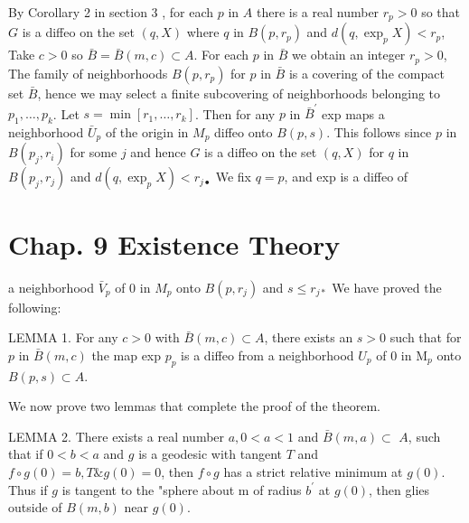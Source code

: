 \documentclass[10pt]{article}
\begin{document}
By Corollary 2 in section 3 , for each $p$ in $A$ there is a real number $r_{p}>0$ so that $G$ is a diffeo on the set $(q, X)$ where $q$ in $B\left(p, r_{p}\right)$ and $d\left(q, \exp _{p} X\right)<r_{p}$, Take $c>0$ so $\bar{B}=\bar{B}(m, c) \subset A .$ For each $p$ in $\bar{B}$ we obtain an integer $r_{p}>0$, The family of neighborhoods $B\left(p, r_{p}\right)$ for $p$ in $\bar{B}$ is a covering of the compact set $\bar{B}$, hence we may select a finite subcovering of neighborhoods belonging to $p_{1}, \ldots, p_{k}$. Let $s=\min \left[r_{1}, \ldots, r_{k}\right]$. Then for any $p$ in $\bar{B}^{\prime}$ exp maps a neighborhood $\bar{U}_{p}$ of the origin in $M_{p}$ diffeo onto $B(p, s)$. This follows since $p$ in $B\left(p_{j}, r_{i}\right)$ for some $j$ and hence $G$ is a diffeo on the set $(q, X)$ for $q$ in $B\left(p_{j}, r_{j}\right)$ and $d\left(q, \exp _{p} X\right)<r_{j \bullet}$ We fix $q=p$, and exp is a diffeo of

\section{Chap. 9 Existence Theory}
a neighborhood $\bar{V}_{p}$ of 0 in $M_{p}$ onto $B\left(p, r_{j}\right)$ and $s \leq r_{j *}$ We have proved the following:

LEMMA 1. For any $c>0$ with $\bar{B}(m, c) \subset A$, there exists an $s>0$ such that for $p$ in $\bar{B}(m, c)$ the map exp $p_{p}$ is a diffeo from a neighborhood $U_{p}$ of 0 in $\mathrm{M}_{p}$ onto $B(p, s) \subset A$.

We now prove two lemmas that complete the proof of the theorem.

LEMMA 2. There exists a real number $a, 0<a<1$ and $\bar{B}(m, a) \subset$ $A$, such that if $0<b<a$ and $g$ is a geodesic with tangent $T$ and $f \circ g(0)=b, T \& g(0)=0$, then $f \circ g$ has a strict relative minimum at $g(0)$. Thus if $g$ is tangent to the "sphere about m of radius $b^{\prime}$ at $g(0)$, then glies outside of $B(m, b)$ near $g(0)$.
\end{document}
